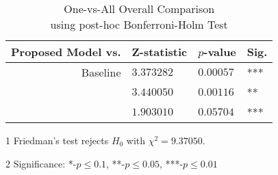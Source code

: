 \begin{table}[!t]
%
\centering
\begin{threeparttable}
\caption{One-vs-All Overall Comparison\\using post-hoc Bonferroni-Holm Test}
\label{results:sdae_stats}
%
\begin{tabular}{@{}r*{3}{l}@{}}
\toprule
Proposed Model vs.                       & Z-statistic    & $p$-value         & Sig.\tnote{2} \\ \midrule
Baseline                                 & $3.373282$      & $0.00057$         & ***          \\
\cite{wang2013protein}                   & $3.440050$      & $0.00116$         & **           \\
\cite{chicco2014deep}                    & $1.903010$      & $0.05704$         & ***          \\ \bottomrule
\end{tabular}
\begin{tablenotes}
\footnotesize
\item[1] Friedman's test rejects $H_{0}$ with $\chi^{2}=\num{9.37050}$.
\item[2] Significance: *-$p\leq0.1$, **-$p\leq0.05$, ***-$p\leq0.01$
\end{tablenotes}
\end{threeparttable}
\end{table}

